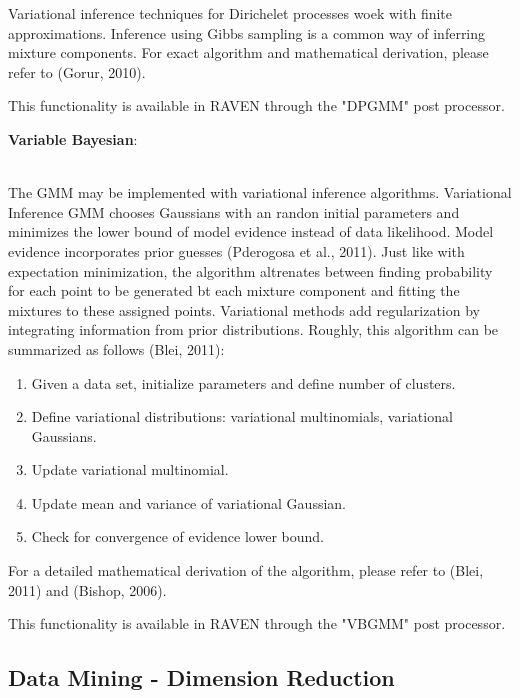 \documentclass[11pt]{article}
\begin{document}
Variational inference techniques for Dirichelet processes woek with finite approximations. Inference using Gibbs sampling is a common way of inferring mixture components. For exact algorithm and mathematical derivation, please refer to (Gorur, 2010). 

This functionality is available in RAVEN through the "DPGMM" post processor. 

\begin{large}
\textbf{Variable Bayesian}:
\end{large} \\

The GMM may be implemented with variational inference algorithms. Variational Inference GMM chooses Gaussians with an randon initial parameters and minimizes the lower bound of model evidence instead of data likelihood. Model evidence incorporates prior guesses (Pderogosa et al., 2011). Just like with expectation minimization, the algorithm altrenates between finding probability for each point to be generated bt each mixture component and fitting the mixtures to these assigned points. Variational methods add regularization by integrating information from prior distributions. Roughly, this algorithm can be summarized as follows (Blei, 2011):

\begin{enumerate}

\item Given a data set, initialize parameters and define number of clusters. 

\item Define variational distributions: variational multinomials, variational Gaussians.

\item Update variational multinomial. 

\item Update mean and variance of variational Gaussian. 

\item Check for convergence of evidence lower bound. 

\end{enumerate}

For a detailed mathematical derivation of the algorithm, please refer to (Blei, 2011) and (Bishop, 2006). 

This functionality is available in RAVEN through the "VBGMM" post processor. 


\subsection{Data Mining - Dimension Reduction}
\end{document}
